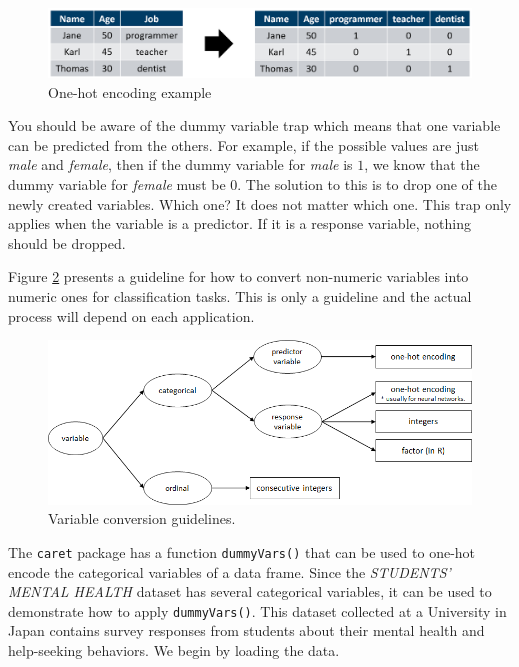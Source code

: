 \documentclass[
  11pt,
]{krantz}
\makeatletter
\newenvironment{kframe}{%
\medskip{}
\setlength{\fboxsep}{.8em}
 \def\at@end@of@kframe{}%
 \ifinner\ifhmode%
  \def\at@end@of@kframe{\end{minipage}}%
  \begin{minipage}{\columnwidth}%
 \fi\fi%
 \def\FrameCommand##1{\hskip\@totalleftmargin \hskip-\fboxsep
 \colorbox{shadecolor}{##1}\hskip-\fboxsep
     \hskip-\linewidth \hskip-\@totalleftmargin \hskip\columnwidth}%
 \MakeFramed {\advance\hsize-\width
   \@totalleftmargin\z@ \linewidth\hsize
   \@setminipage}}%
 {\par\unskip\endMakeFramed%
 \at@end@of@kframe}
\newenvironment{rmdblock}[1]
  {
  \begin{itemize}
  \renewcommand{\labelitemi}{
    \raisebox{-.7\height}[0pt][0pt]{
      {\setkeys{Gin}{width=3em,keepaspectratio}\texttt{[image: images/icons/\#1]}}
    }
  }
  \setlength{\fboxsep}{1em}
  \begin{kframe}
  \item
  }
  {
  \end{kframe}
  \end{itemize}
  }
\newenvironment{rmdcaution}
  {\begin{rmdblock}{caution}}
  {\end{rmdblock}}
\makeatother
\begin{document}
\begin{figure}

{\centering \includegraphics[width=1\linewidth]{images/onehotenc} 

}

\caption{One-hot encoding example}\label{fig:onehotenc}
\end{figure}

\begin{rmdcaution}
You should be aware of the dummy variable trap which means that one variable can be predicted from the others. For example, if the possible values are just \emph{male} and \emph{female}, then if the dummy variable for \emph{male} is \(1\), we know that the dummy variable for \emph{female} must be \(0\). The solution to this is to drop one of the newly created variables. Which one? It does not matter which one. This trap only applies when the variable is a predictor. If it is a response variable, nothing should be dropped.
\end{rmdcaution}

Figure \ref{fig:variableConversion} presents a guideline for how to convert non-numeric variables into numeric ones for classification tasks. This is only a guideline and the actual process will depend on each application.

\begin{figure}

{\centering \includegraphics[width=1\linewidth]{images/variable_conversion} 

}

\caption{Variable conversion guidelines.}\label{fig:variableConversion}
\end{figure}

The \texttt{caret} package has a function \texttt{dummyVars()} that can be used to one-hot encode the categorical variables of a data frame. Since the \emph{STUDENTS' MENTAL HEALTH} dataset \citep{Minh2019} has several categorical variables, it can be used to demonstrate how to apply \texttt{dummyVars()}. This dataset collected at a University in Japan contains survey responses from students about their mental health and help-seeking behaviors. We begin by loading the data.
\end{document}
